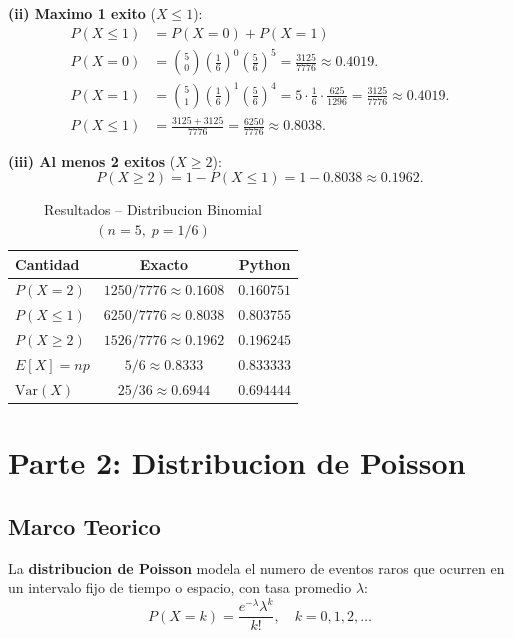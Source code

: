 \documentclass[12pt,a4paper]{article}
\begin{document}
\textbf{(ii) Maximo 1 exito} ($X \leq 1$):
\begin{align*}
  P(X \leq 1) &= P(X=0) + P(X=1) \\
  P(X=0) &= \binom{5}{0}\!\left(\tfrac{1}{6}\right)^{\!0}\!\left(\tfrac{5}{6}\right)^{\!5}
            = \frac{3125}{7776} \approx 0.4019.\\
  P(X=1) &= \binom{5}{1}\!\left(\tfrac{1}{6}\right)^{\!1}\!\left(\tfrac{5}{6}\right)^{\!4}
            = 5 \cdot \frac{1}{6} \cdot \frac{625}{1296}
            = \frac{3125}{7776} \approx 0.4019.\\
  P(X \leq 1) &= \frac{3125 + 3125}{7776} = \frac{6250}{7776} \approx \mathbf{0.8038}.
\end{align*}

\textbf{(iii) Al menos 2 exitos} ($X \geq 2$):
\[
  P(X \geq 2) = 1 - P(X \leq 1) = 1 - 0.8038 \approx \mathbf{0.1962}.
\]

\begin{table}[H]
\centering
\caption{Resultados -- Distribucion Binomial $(n=5,\; p=1/6)$}
\renewcommand{\arraystretch}{1.4}
\begin{tabular}{lcc}
\toprule
\textbf{Cantidad} & \textbf{Exacto} & \textbf{Python} \\
\midrule
$P(X = 2)$      & $1250/7776 \approx 0.1608$ & $0.160751$ \\
$P(X \leq 1)$   & $6250/7776 \approx 0.8038$ & $0.803755$ \\
$P(X \geq 2)$   & $1526/7776 \approx 0.1962$ & $0.196245$ \\
$E[X] = np$     & $5/6 \approx 0.8333$       & $0.833333$ \\
$\mathrm{Var}(X)$ & $25/36 \approx 0.6944$   & $0.694444$ \\
\bottomrule
\end{tabular}
\end{table}

\section{Parte 2: Distribucion de Poisson}

\subsection{Marco Teorico}

La \textbf{distribucion de Poisson} modela el numero de eventos raros que ocurren
en un intervalo fijo de tiempo o espacio, con tasa promedio $\lambda$:
\[
  \boxed{P(X = k) = \frac{e^{-\lambda}\lambda^{k}}{k!}, \quad k = 0, 1, 2, \ldots}
\]
\end{document}
